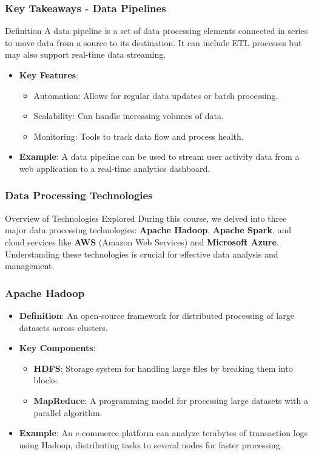 \documentclass{beamer}
\begin{document}
\begin{frame}[fragile]
    \frametitle{Key Takeaways - Data Pipelines}
    \begin{block}{Definition}
        A data pipeline is a set of data processing elements connected in series to move data from a source to its destination. It can include ETL processes but may also support real-time data streaming.
    \end{block}
    \begin{itemize}
        \item \textbf{Key Features}:
        \begin{itemize}
            \item Automation: Allows for regular data updates or batch processing.
            \item Scalability: Can handle increasing volumes of data.
            \item Monitoring: Tools to track data flow and process health.
        \end{itemize}
        \item \textbf{Example}: A data pipeline can be used to stream user activity data from a web application to a real-time analytics dashboard.
    \end{itemize}
\end{frame}

\begin{frame}[fragile]
    \frametitle{Data Processing Technologies}
    \begin{block}{Overview of Technologies Explored}
        During this course, we delved into three major data processing technologies: 
        \textbf{Apache Hadoop}, \textbf{Apache Spark}, and cloud services like 
        \textbf{AWS} (Amazon Web Services) and \textbf{Microsoft Azure}. 
        Understanding these technologies is crucial for effective data analysis and management.
    \end{block}
\end{frame}

\begin{frame}[fragile]
    \frametitle{Apache Hadoop}
    \begin{itemize}
        \item \textbf{Definition}: An open-source framework for distributed processing of large datasets across clusters.
        \item \textbf{Key Components}:
            \begin{itemize}
                \item \textbf{HDFS}: Storage system for handling large files by breaking them into blocks.
                \item \textbf{MapReduce}: A programming model for processing large datasets with a parallel algorithm.
            \end{itemize}
        \item \textbf{Example}: An e-commerce platform can analyze terabytes of transaction logs using Hadoop, distributing tasks to several nodes for faster processing.
    \end{itemize}
\end{frame}
\end{document}
